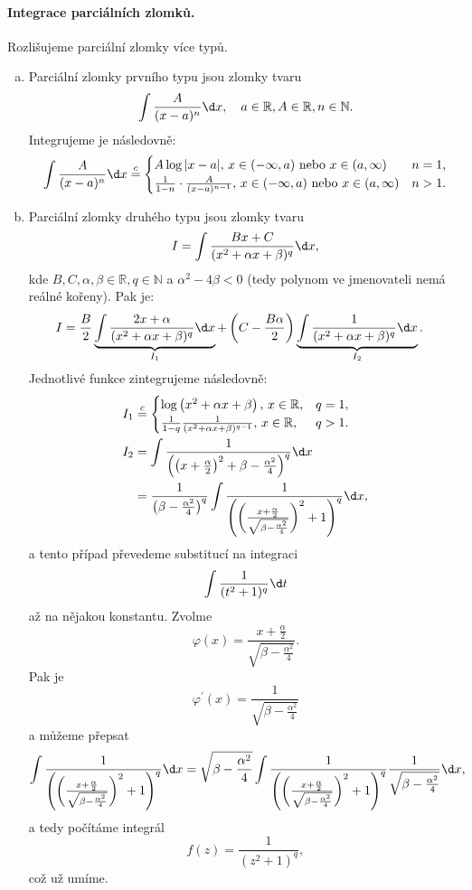 \paragraph{Integrace parciálních zlomků.} Rozlišujeme parciální zlomky více typů.
\begin{enumerate}[(a)]
	\item Parciální zlomky prvního typu jsou zlomky tvaru
	$$\int \frac{A}{(x-a)^n}\d x, \quad a \in \mathbb R , A\in \mathbb R , n \in \mathbb N .$$
	Integrujeme je následovně:
	$$
	    \int \frac{A}{(x-a)^n}\d x\stackrel{c}{=}\begin{cases}
						A\log |x-a|, \, x \in (-\infty, a) \text{ nebo } x \in (a,\infty) & n=1,\\
						\frac{1}{1-n}\cdot \frac{A}{(x-a)^{n-1}}, \, x \in (-\infty, a) \text{ nebo } x \in (a,\infty) & n > 1.
					\end{cases}
	$$
	\item Parciální zlomky druhého typu jsou zlomky tvaru
	$$
	    I=\int \frac{Bx+C}{(x^2+\alpha x + \beta)^q}\d x,
	$$
	kde $B,C,\alpha, \beta \in \mathbb R , q \in \mathbb N $ a $\alpha^2-4\beta < 0$ (tedy
	polynom ve jmenovateli nemá reálné kořeny). Pak je:
	\begin{align*}
	I &= \frac{B}{2}\underbrace{\int \frac{2x+\alpha}{(x^2+\alpha x + \beta)^q}\d x}_{I_1} + \left( C-\frac{B\alpha}{2} \right ) \underbrace{\int \frac{1}{(x^2+\alpha x+\beta)^q}\d x}_{I_2}.
\end{align*}
Jednotlivé funkce zintegrujeme následovně:
\begin{align*}
I_1 &\stackrel{c}{=} \begin{cases}
\log \left( x^2+\alpha x + \beta \right ),\,  x \in \mathbb R , & q=1,\\
\frac{1}{1-q}\frac{1}{(x^2+\alpha x +\beta)^{q-1}}, \, x \in \mathbb R, & q > 1.
\end{cases}\\
I_2 &= \int \frac{1}{\left(\left( x+ \frac{\alpha}{2} \right )^2+\beta - \frac{\alpha^2}{4} \right)^q}\d x\\
&= \frac{1}{\left( \beta - \frac{\alpha^2}{4} \right )^q }\int \frac{1}{\left( \left( \frac{x+\frac{\alpha}{2}}{\sqrt{\beta - \frac{\alpha^2}{4}}} \right )^2+1  \right )^q }\d x,
\end{align*}
a tento případ převedeme substitucí na integraci
$$
    \int \frac{1}{(t^2+1)^q}\d t
$$
až na nějakou konstantu. Zvolme
$$
    \varphi(x) = \frac{x+ \frac{\alpha}{2}}{\sqrt{\beta - \frac{\alpha^2}{4}}}.
$$
Pak je
$$
    \varphi^\prime(x) = \frac{1}{\sqrt{\beta - \frac{\alpha^2}{4}}}
$$
a můžeme přepsat
$$
    \int \frac{1}{\left( \left( \frac{x+\frac{\alpha}{2}}{\sqrt{\beta - \frac{\alpha^2}{4}}} \right )^2+1  \right )^q }\d x = \sqrt{\beta - \frac{\alpha^2}{4}}\int \frac{1}{\left( \left( \frac{x+\frac{\alpha}{2}}{\sqrt{\beta - \frac{\alpha^2}{4}}} \right )^2+1  \right )^q } \frac{1}{\sqrt{\beta - \frac{\alpha^2}{4}}}\d x,
$$
a tedy počítáme integrál
$$
f(z)= \frac{1}{\left( z^2+1 \right )^q },
$$
což už umíme.
\end{enumerate}

